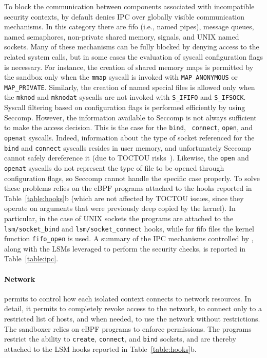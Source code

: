 To block the communication between components associated with
incompatible security contexts, \natisand by default denies IPC over
globally visible communication mechanisms. In this category there are
fifo (i.e., named pipes), message queues, named semaphores,
non-private shared memory, signals, and UNIX named sockets.  Many of
these mechanisms can be fully blocked by denying access to the related
system calls, but in some cases the evaluation of syscall
configuration flags is necessary. For instance, the creation of shared
memory maps is permitted by the sandbox only when the {\tt mmap}
syscall is invoked with {\tt MAP\_ANONYMOUS} or {\tt
  MAP\_PRIVATE}. Similarly, the creation of named special files is
allowed only when the {\tt mknod} and {\tt mknodat} syscalls are not
invoked with {\tt S\_IFIFO} and {\tt S\_IFSOCK}. Syscall filtering
based on configuration flags is performed efficiently by \natisand using
Seccomp.
However, the information available to Seccomp is not always sufficient
to make the access decision. This is the case for the {\tt bind}, {\tt
  connect}, {\tt open}, and {\tt openat} syscalls.  Indeed,
information about the type of socket referenced for the {\tt bind} and
{\tt connect} syscalls resides in user memory, and unfortunately
Seccomp cannot safely dereference it (due to
TOCTOU risks~\cite{seccomp-toctou}). Likewise, the {\tt open} and {\tt openat} syscalls do
not represent the type of file to be opened through configuration
flags, so Seccomp cannot handle the specific case properly. To solve
these problems \natisand relies on the eBPF programs attached to the hooks
reported in Table~\ref{table:hooks}b (which are not affected by TOCTOU
issues, since they operate on arguments that were previously deep
  copied by the kernel). In particular, in the case of UNIX sockets the programs are
attached to the {\tt lsm/socket\_bind} and {\tt lsm/socket\_connect}
hooks, while for fifo files the kernel function {\tt fifo\_open} is
used. A summary of the IPC mechanisms controlled by \natisand, along with
the LSMs leveraged to perform the security checks, is reported in
Table~\ref{table:ipc}.

\paragraph{Network}
%
\natisand permits to control how each isolated context connects to network
resources. In detail, it permits to completely revoke access to the
network, to connect only to a restricted list of hosts, and when
needed, to use the network without restrictions. The sandboxer relies
on eBPF programs to enforce permissions. The programs restrict the
ability to {\tt create}, {\tt connect}, and {\tt bind} sockets, and
are thereby attached to the LSM hooks reported in
Table~\ref{table:hooks}b.

